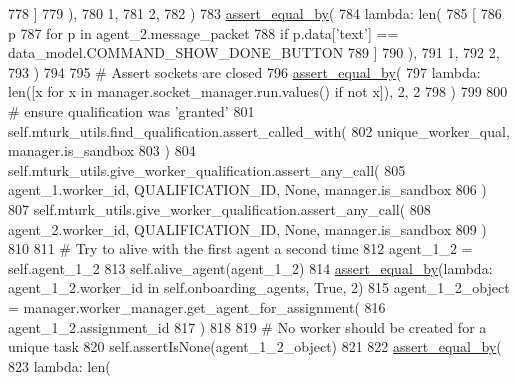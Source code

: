 \begin{DoxyCode}
778                 ]
779             ),
780             1,
781             2,
782         )
783         \hyperlink{namespaceparlai_1_1mturk_1_1core_1_1test_1_1test__full__system_a0b463246d35658a2e422010f13dcf819}{assert\_equal\_by}(
784             \textcolor{keyword}{lambda}: len(
785                 [
786                     p
787                     \textcolor{keywordflow}{for} p \textcolor{keywordflow}{in} agent\_2.message\_packet
788                     \textcolor{keywordflow}{if} p.data[\textcolor{stringliteral}{'text'}] == data\_model.COMMAND\_SHOW\_DONE\_BUTTON
789                 ]
790             ),
791             1,
792             2,
793         )
794 
795         \textcolor{comment}{# Assert sockets are closed}
796         \hyperlink{namespaceparlai_1_1mturk_1_1core_1_1test_1_1test__full__system_a0b463246d35658a2e422010f13dcf819}{assert\_equal\_by}(
797             \textcolor{keyword}{lambda}: len([x \textcolor{keywordflow}{for} x \textcolor{keywordflow}{in} manager.socket\_manager.run.values() \textcolor{keywordflow}{if} \textcolor{keywordflow}{not} x]), 2, 2
798         )
799 
800         \textcolor{comment}{# ensure qualification was 'granted'}
801         self.mturk\_utils.find\_qualification.assert\_called\_with(
802             unique\_worker\_qual, manager.is\_sandbox
803         )
804         self.mturk\_utils.give\_worker\_qualification.assert\_any\_call(
805             agent\_1.worker\_id, QUALIFICATION\_ID, \textcolor{keywordtype}{None}, manager.is\_sandbox
806         )
807         self.mturk\_utils.give\_worker\_qualification.assert\_any\_call(
808             agent\_2.worker\_id, QUALIFICATION\_ID, \textcolor{keywordtype}{None}, manager.is\_sandbox
809         )
810 
811         \textcolor{comment}{# Try to alive with the first agent a second time}
812         agent\_1\_2 = self.agent\_1\_2
813         self.alive\_agent(agent\_1\_2)
814         \hyperlink{namespaceparlai_1_1mturk_1_1core_1_1test_1_1test__full__system_a0b463246d35658a2e422010f13dcf819}{assert\_equal\_by}(\textcolor{keyword}{lambda}: agent\_1\_2.worker\_id \textcolor{keywordflow}{in} self.onboarding\_agents, \textcolor{keyword}{True}, 2)
815         agent\_1\_2\_object = manager.worker\_manager.get\_agent\_for\_assignment(
816             agent\_1\_2.assignment\_id
817         )
818 
819         \textcolor{comment}{# No worker should be created for a unique task}
820         self.assertIsNone(agent\_1\_2\_object)
821 
822         \hyperlink{namespaceparlai_1_1mturk_1_1core_1_1test_1_1test__full__system_a0b463246d35658a2e422010f13dcf819}{assert\_equal\_by}(
823             \textcolor{keyword}{lambda}: len(

\end{DoxyCode}

